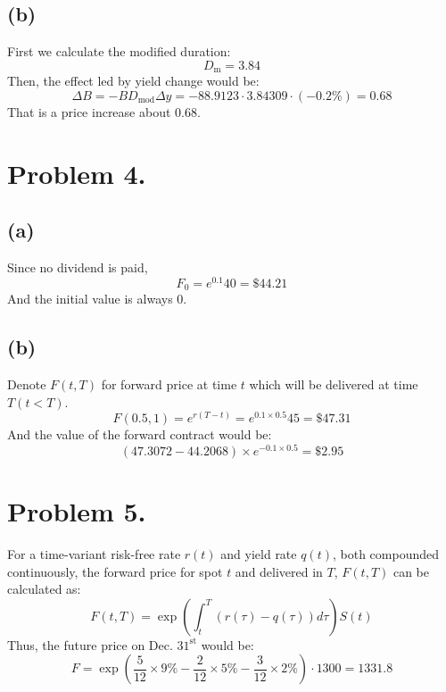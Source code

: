 \documentclass{article}
\begin{document}
\subsection{(b)}
First we calculate the modified duration:
\begin{equation}
  D_{\text{m}} = 3.84
\end{equation}
Then, the effect led by yield change would be:
\begin{equation}
  \Delta B = - B D_{\text{mod}} \Delta y = - 88.9123 \cdot 3.84309 \cdot (- 0.2 \%) = 0.68
\end{equation}
That is a price increase about 0.68.

\section{Problem 4.}
\subsection{(a)}
Since no dividend is paid, 
\begin{equation}
  F_0 = e^{0.1} 40 = \$44.21
\end{equation}
And the initial value is always 0.

\subsection{(b)}
Denote $F(t,T)$ for forward price at time $t$ which will be delivered at time $T (t<T)$.
\begin{equation}
  F(0.5, 1) = e^{r(T-t)} = e^{0.1 \times 0.5} 45 = \$47.31
\end{equation}
And the value of the forward contract would be:
\begin{equation}
  (47.3072 - 44.2068) \times e^{-0.1 \times 0.5} = \$2.95
\end{equation}
\section{Problem 5.}
For a time-variant risk-free rate $r(t)$ and yield rate $q(t)$, both compounded continuously, the forward price for spot $t$ and delivered in $T$, $F(t, T)$ can be calculated as:
\begin{equation}
   F(t, T) = \exp \left( {\int_{t}^{T} (r(\tau) - q(\tau)) d\tau} \right) S(t) 
\end{equation}
Thus, the future price on Dec. $31^\text{st}$ would be:
\begin{equation}
  F = \exp \left( \frac{5}{12} \times 9 \% -\frac{2}{12} \times 5 \% - \frac{3}{12} \times 2 \% \right) \cdot 1300 = 1331.8
\end{equation}
\end{document}
